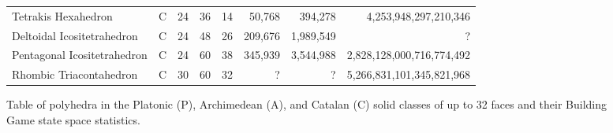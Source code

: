 \begin{figure}[ht]
{\begin{tabular}{ l | c | c | c | c || r | r | r}
Tetrakis Hexahedron             & C & 24 & 36 & 14 	& 50,768        & 394,278       & 4,253,948,297,210,346\\
Deltoidal Icositetrahedron      & C & 24 & 48 & 26 	& 209,676       & 1,989,549     & ? \\
Pentagonal Icositetrahedron     & C & 24 & 60 & 38 	& 345,939       & 3,544,988     & 2,828,128,000,716,774,492\\
Rhombic Triacontahedron         & C & 30 & 60 & 32 	& ?             & ?             & 5,266,831,101,345,821,968\\
  \hline  
\end{tabular}
}
\caption{Table of polyhedra in the Platonic (P), Archimedean (A), and Catalan (C) solid classes of up to 32 faces and their Building Game state space statistics.}
\label{fig:bgtable}
\end{figure}


